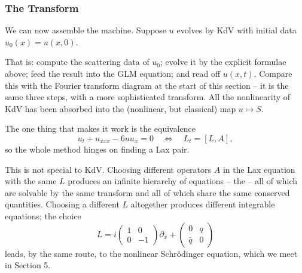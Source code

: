 \subsubsection{The Transform}

We can now assemble the machine. Suppose $u$ evolves by KdV with initial data $u_0(x) = u(x,0)$.
\begin{center}
\end{center}

That is: compute the scattering data of $u_0$; evolve it by the explicit formulae above; feed the result into the GLM equation; and read off $u(x,t)$. Compare this with the Fourier transform diagram at the start of this section -- it is the same three steps, with a more sophisticated transform. All the nonlinearity of KdV has been absorbed into the (nonlinear, but classical) map $u\mapsto S$.

The one thing that makes it work is the equivalence
$$
u_t + u_{xxx} - 6uu_x = 0 \quad\Longleftrightarrow\quad L_t = [L,A],
$$
so the whole method hinges on finding a Lax pair.

\begin{remark}
	This is not special to KdV. Choosing different operators $A$ in the Lax equation with the same $L$ produces an infinite hierarchy of equations -- the  -- all of which are solvable by the same transform and all of which share the same conserved quantities. Choosing a different $L$ altogether produces different integrable equations; the choice
	$$
	L = i\begin{pmatrix}1 & 0\\0&-1\end{pmatrix}\partial_x + \begin{pmatrix}0 & q\\ \bar q & 0\end{pmatrix}
	$$
	leads, by the same route, to the nonlinear Schr\"odinger equation, which we meet in Section 5.
\end{remark}

